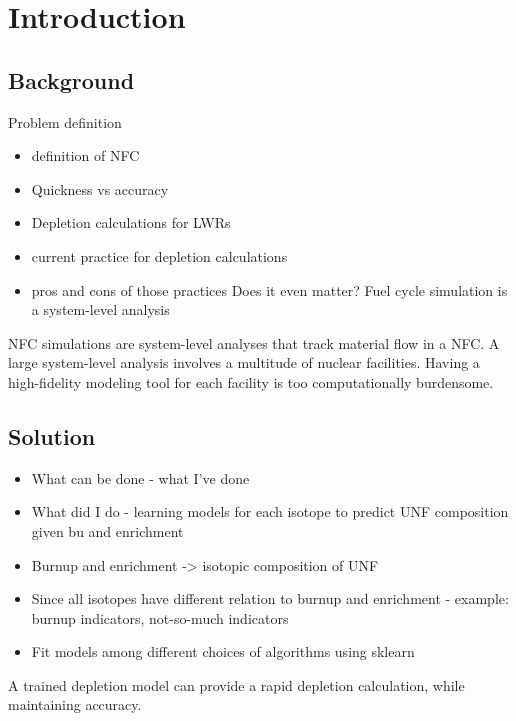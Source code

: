 \section{Introduction}
\subsection{Background}
Problem definition
\begin{itemize}
    \item definition of NFC
    \item Quickness vs accuracy
    \item Depletion calculations for LWRs
    \item current practice for depletion calculations
    \item pros and cons of those practices
    \itme Does it even matter? Fuel cycle simulation is a system-level analysis
\end{itemize}

\gls{NFC} simulations are system-level analyses that track
material flow in a \gls{NFC}. A large system-level analysis
involves a multitude of nuclear facilities. Having a high-fidelity
modeling tool for each facility is too computationally burdensome.



\subsection{Solution}
\begin{itemize}
    \item What can be done - what I've done
    \item What did I do - learning models for each isotope to predict UNF composition given bu and enrichment
    \item Burnup and enrichment -> isotopic composition of UNF
    \item Since all isotopes have different relation to burnup and enrichment
            - example: burnup indicators, not-so-much indicators
    \item Fit models among different choices of algorithms using sklearn
\end{itemize}

A trained depletion model can provide a rapid depletion calculation, while
maintaining accuracy.
